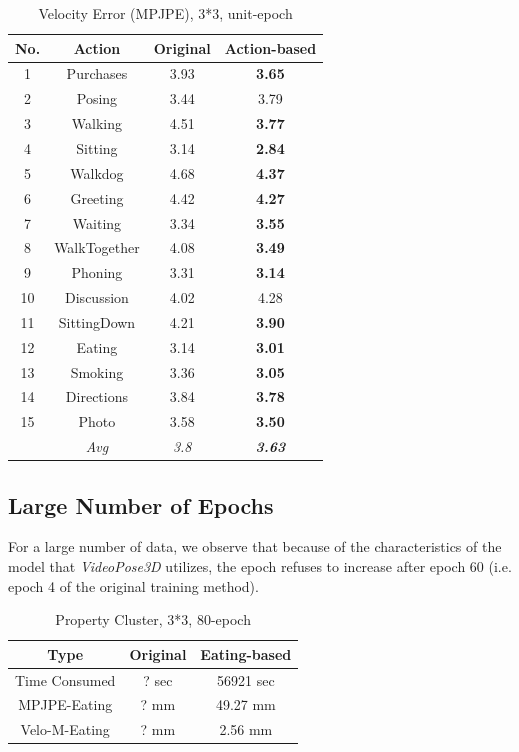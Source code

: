 \documentclass[10pt,twocolumn,letterpaper]{article}
\begin{document}
\begin{table}[H]
\caption{Velocity Error (MPJPE), 3*3, unit-epoch}

\begin{center}

\begin{tabular}{cccc}
\hline
No. & Action & Original & Action-based \\
\hline

1&Purchases& 3.93 & \textbf{3.65} \\
2&Posing& 3.44 & 3.79 \\
3&Walking& 4.51 & \textbf{3.77}\\
4&Sitting& 3.14 & \textbf{2.84} \\
5&Walkdog& 4.68 & \textbf{4.37} \\
6&Greeting& 4.42 & \textbf{4.27}\\
7&Waiting& 3.34 & \textbf{3.55} \\
8&WalkTogether& 4.08 & \textbf{3.49}\\
9&Phoning& 3.31 & \textbf{3.14} \\
10&Discussion& 4.02 & 4.28 \\
11&SittingDown& 4.21 & \textbf{3.90}\\
12&Eating& 3.14 & \textbf{3.01} \\
13&Smoking& 3.36 & \textbf{3.05}\\
14&Directions& 3.84 & \textbf{3.78}\\
15&Photo& 3.58 & \textbf{3.50}\\
&\textit{Avg}& \textit{3.8} & \textit{\textbf{3.63}}\\

\hline
\end{tabular}

\end{center}

\end{table}


\subsection{Large Number of Epochs}

For a large number of data, we observe that because of the characteristics of the model that \textit{VideoPose3D}
utilizes, the epoch refuses to increase after epoch 60 (i.e. epoch 4 of the original training method).


\begin{table}[H]
\caption{Property Cluster, 3*3, 80-epoch}
\centering
\begin{tabular}{ccc}
\hline
Type & Original  & Eating-based\\
\hline

Time Consumed&  ? sec & 56921 sec\\
MPJPE-Eating&  ? mm & 49.27 mm\\
Velo-M-Eating&  ? mm & 2.56 mm  \\

\hline
\end{tabular}
\end{table}
\end{document}
